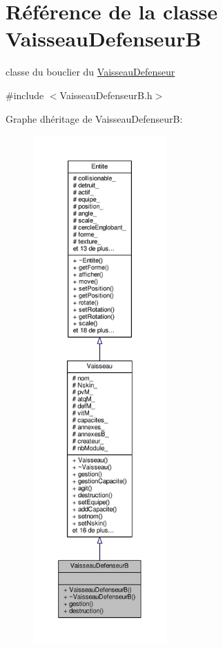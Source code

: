 \hypertarget{class_vaisseau_defenseur_b}{}\section{Référence de la classe Vaisseau\+DefenseurB}
\label{class_vaisseau_defenseur_b}


classe du bouclier du \hyperlink{class_vaisseau_defenseur}{Vaisseau\+Defenseur}  




{\ttfamily \#include $<$Vaisseau\+Defenseur\+B.\+h$>$}



Graphe d\textquotesingle{}héritage de Vaisseau\+DefenseurB\+:\nopagebreak
\begin{figure}[H]
\begin{center}
\leavevmode
\includegraphics[height=550pt]{class_vaisseau_defenseur_b__inherit__graph}
\end{center}
\end{figure}


